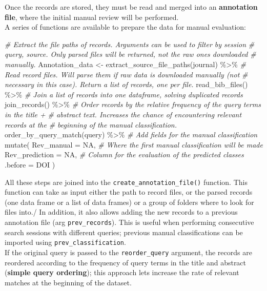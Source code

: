 \documentclass[
]{article}
\newenvironment{Shaded}{\begin{snugshade}}{\end{snugshade}}
\newcommand{\AttributeTok}[1]{\textcolor[rgb]{0.77,0.63,0.00}{#1}}
\newcommand{\CommentTok}[1]{\textcolor[rgb]{0.56,0.35,0.01}{\textit{#1}}}
\newcommand{\ConstantTok}[1]{\textcolor[rgb]{0.00,0.00,0.00}{#1}}
\newcommand{\FunctionTok}[1]{\textcolor[rgb]{0.00,0.00,0.00}{#1}}
\newcommand{\NormalTok}[1]{#1}
\newcommand{\OtherTok}[1]{\textcolor[rgb]{0.56,0.35,0.01}{#1}}
\newcommand{\SpecialCharTok}[1]{\textcolor[rgb]{0.00,0.00,0.00}{#1}}
\begin{document}
Once the records are stored, they must be read and merged into an
\textbf{annotation file}, where the initial manual review will be
performed.\\
A series of functions are available to prepare the data for manual
evaluation:

\begin{Shaded}
\begin{Highlighting}[]
\CommentTok{\# Extract the file paths of records. Arguments can be used to filter by session}
\CommentTok{\# query, source. Only parsed files will be returned, not the raw ones downloaded}
\CommentTok{\# manually.}
\NormalTok{Annotation\_data }\OtherTok{\textless{}{-}} \FunctionTok{extract\_source\_file\_paths}\NormalTok{(journal) }\SpecialCharTok{\%\textgreater{}\%}
  \CommentTok{\# Read record files. Will parse them if raw data is downloaded manually (not}
  \CommentTok{\# necessary in this case). Return a list of records, one per file.}
  \FunctionTok{read\_bib\_files}\NormalTok{() }\SpecialCharTok{\%\textgreater{}\%}
  \CommentTok{\# Join a list of records into one dataframe, solving duplicated records}
  \FunctionTok{join\_records}\NormalTok{() }\SpecialCharTok{\%\textgreater{}\%}
  \CommentTok{\# Order records by the relative frequency of the query terms in the title +}
  \CommentTok{\# abstract text. Increases the chance of encountering relevant records at the}
  \CommentTok{\# beginning of the manual classification.}
  \FunctionTok{order\_by\_query\_match}\NormalTok{(query) }\SpecialCharTok{\%\textgreater{}\%}
  \CommentTok{\# Add fields for the manual classification}
  \FunctionTok{mutate}\NormalTok{(}
    \AttributeTok{Rev\_manual =} \ConstantTok{NA}\NormalTok{, }\CommentTok{\# Where the first manual classification will be made}
    \AttributeTok{Rev\_prediction =} \ConstantTok{NA}\NormalTok{, }\CommentTok{\# Column for the evaluation of the predicted classes}
    \AttributeTok{.before =}\NormalTok{ DOI}
\NormalTok{  )}
\end{Highlighting}
\end{Shaded}

All these steps are joined into the \texttt{create\_annotation\_file()}
function. This function can take as input either the path to record
files, or the parsed records (one data frame or a list of data frames)
or a group of folders where to look for files into./ In addition, it
also allows adding the new records to a previous annotation file (arg
\texttt{prev\_records}). This is useful when performing consecutive
search sessions with different queries; previous manual classifications
can be imported using \texttt{prev\_classification}.\\
If the original query is passed to the \texttt{reorder\_query} argument,
the records are reordered according to the frequency of query terms in
the title and abstract (\textbf{simple query ordering}); this approach
lets increase the rate of relevant matches at the beginning of the
dataset.
\end{document}
